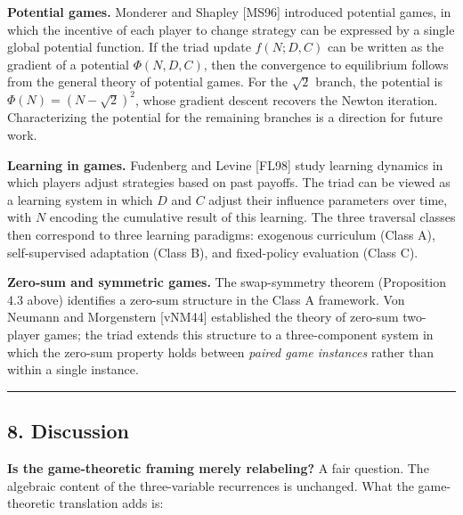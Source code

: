 \documentclass[
  11pt,
  letterpaper,
]{article}
\begin{document}
\textbf{Potential games.} Monderer and Shapley {[}MS96{]} introduced
potential games, in which the incentive of each player to change
strategy can be expressed by a single global potential function. If the
triad update \(f(N; D, C)\) can be written as the gradient of a
potential \(\Phi(N, D, C)\), then the convergence to equilibrium follows
from the general theory of potential games. For the \(\sqrt{2}\) branch,
the potential is \(\Phi(N) = (N - \sqrt{2})^2\), whose gradient descent
recovers the Newton iteration. Characterizing the potential for the
remaining branches is a direction for future work.

\textbf{Learning in games.} Fudenberg and Levine {[}FL98{]} study
learning dynamics in which players adjust strategies based on past
payoffs. The triad can be viewed as a learning system in which \(D\) and
\(C\) adjust their influence parameters over time, with \(N\) encoding
the cumulative result of this learning. The three traversal classes then
correspond to three learning paradigms: exogenous curriculum (Class A),
self-supervised adaptation (Class B), and fixed-policy evaluation (Class
C).

\textbf{Zero-sum and symmetric games.} The swap-symmetry theorem
(Proposition 4.3 above) identifies a zero-sum structure in the Class A
framework. Von Neumann and Morgenstern {[}vNM44{]} established the
theory of zero-sum two-player games; the triad extends this structure to
a three-component system in which the zero-sum property holds between
\emph{paired game instances} rather than within a single instance.

\begin{center}\rule{0.5\linewidth}{0.5pt}\end{center}

\subsection{8. Discussion}\label{discussion}

\textbf{Is the game-theoretic framing merely relabeling?} A fair
question. The algebraic content of the three-variable recurrences is
unchanged. What the game-theoretic translation adds is:
\end{document}
